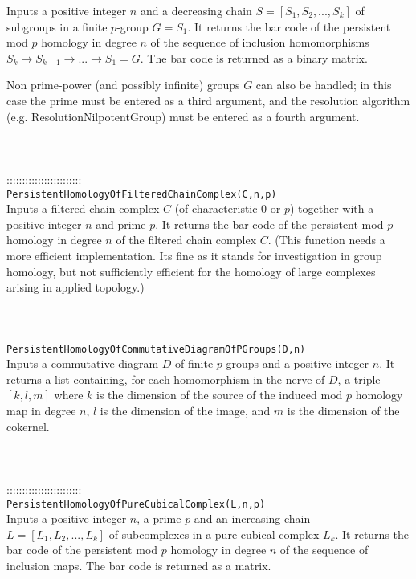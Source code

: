 \documentclass[a4paper,11pt]{report}
\begin{document}
{ Inputs a positive integer $n$ and a decreasing chain $S=[S_1, S_2, ..., S_k]$ of subgroups in a finite $p$-group $G=S_1$. It returns the bar code of the persistent mod $p$ homology in degree $n$ of the sequence of inclusion homomorphisms $S_k \rightarrow S_{k-1} \rightarrow ... \rightarrow S_1=G $. The bar code is returned as a binary matrix. 

 Non prime-power (and possibly infinite) groups $G$ can also be handled; in this case the prime must be entered as a third
argument, and the resolution algorithm (e.g. ResolutionNilpotentGroup) must be
entered as a fourth argument. \\
 \\
 \\
 \\
 ::::::::::::::::::::::::\\
 \texttt{PersistentHomologyOfFilteredChainComplex(C,n,p) }\\
 

 Inputs a filtered chain complex $C$ (of characteristic $0$ or $p$) together with a positive integer $n$ and prime $p$. It returns the bar code of the persistent mod $p$ homology in degree $n$ of the filtered chain complex $C$. (This function needs a more efficient implementation. Its fine as it stands
for investigation in group homology, but not sufficiently efficient for the
homology of large complexes arising in applied topology.) \\
 \\
 \\
 \\
 \texttt{PersistentHomologyOfCommutativeDiagramOfPGroups(D,n) }\\
 

 Inputs a commutative diagram $D$ of finite $p$-groups and a positive integer $n$. It returns a list containing, for each homomorphism in the nerve of $D$, a triple $[k,l,m]$ where $k$ is the dimension of the source of the induced mod $p$ homology map in degree $n$, $l$ is the dimension of the image, and $m$ is the dimension of the cokernel. \\
 \\
 \\
 \\
 ::::::::::::::::::::::::\\
 \texttt{PersistentHomologyOfPureCubicalComplex(L,n,p)}\\
 

 Inputs a positive integer $n$, a prime $p$ and an increasing chain $L=[L_1, L_2, ..., L_k]$ of subcomplexes in a pure cubical complex $L_k$. It returns the bar code of the persistent mod $p$ homology in degree $n$ of the sequence of inclusion maps. The bar code is returned as a matrix. 

}
\end{document}
